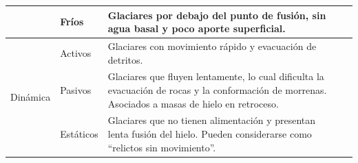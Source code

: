\begin{table}[H]
\begin{tabularx}{\linewidth}{@{} *5{X} @{}}
                                                   & Fríos         & Glaciares por debajo del punto de fusión, sin agua basal y poco aporte superficial.                                                                                                          \\ \hline
        \multirow{3}{=}{\parbox{4cm}{Dinámica}}    & Activos       & Glaciares con movimiento rápido y evacuación de detritos.                                                                                                                                    \\ \cline{2-3}
                                                   & Pasivos       & Glaciares que fluyen lentamente, lo cual dificulta la evacuación de rocas y la conformación de morrenas. Asociados a masas de hielo en retroceso.                                            \\ \cline{2-3}
                                                   & Estáticos     & Glaciares que no tienen alimentación y presentan lenta fusión del hielo. Pueden considerarse como “relictos sin movimiento”.                                                                 \\ \hline
    \end{tabularx}
    \begin{minipage}{\textwidth}
        \vspace{10pt}
        \label{tab:ClasificacionGlaciaresI}
    \end{minipage}
\end{table}


